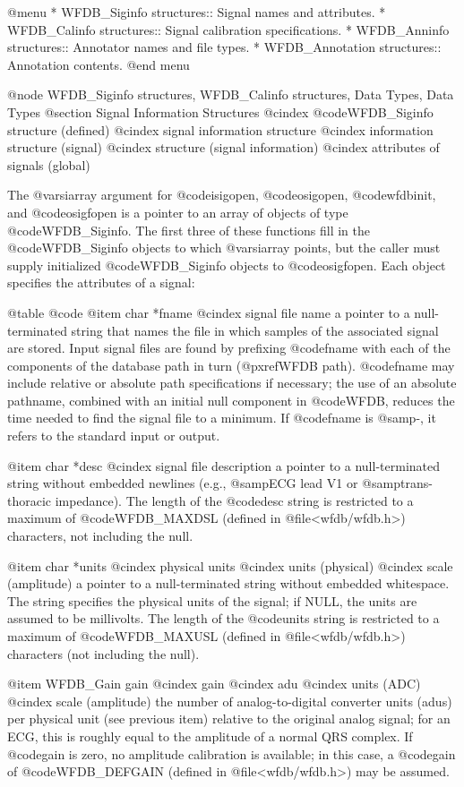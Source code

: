 {{{{{{{{{{@menu
* WFDB_Siginfo structures::		Signal names and attributes.
* WFDB_Calinfo structures::		Signal calibration specifications.
* WFDB_Anninfo structures::		Annotator names and file types.
* WFDB_Annotation structures::		Annotation contents.
@end menu

@node WFDB_Siginfo structures, WFDB_Calinfo structures, Data Types, Data Types
@section Signal Information Structures
@cindex @code{WFDB_Siginfo} structure (defined)
@cindex signal information structure
@cindex information structure (signal)
@cindex structure (signal information)
@cindex attributes of signals (global)

The @var{siarray} argument for @code{isigopen}, @code{osigopen},
@code{wfdbinit}, and @code{osigfopen} is a pointer to an array of
objects of type @code{WFDB_Siginfo}.  The first three of these functions
fill in the @code{WFDB_Siginfo} objects to which @var{siarray} points, but
the caller must supply initialized @code{WFDB_Siginfo} objects to
@code{osigfopen}.  Each object specifies the attributes of a
signal:

@table @code
@item char *fname
@cindex signal file name
a pointer to a null-terminated string that names the file in which
samples of the associated signal are stored.  Input signal files are
found by prefixing @code{fname} with each of the components of the
database path in turn (@pxref{WFDB path}).  @code{fname} may include
relative or absolute path specifications if necessary; the use of an
absolute pathname, combined with an initial null component in @code{WFDB},
reduces the time needed to find the signal file to a minimum.  If
@code{fname} is @samp{-}, it refers to the standard input or
output.

@item char *desc
@cindex signal file description
a pointer to a null-terminated string without embedded newlines (e.g.,
@samp{ECG lead V1} or @samp{trans-thoracic impedance}).  The length of
the @code{desc} string is restricted to a maximum of @code{WFDB_MAXDSL}
(defined in @file{<wfdb/wfdb.h>}) characters, not including the null.

@item char *units
@cindex physical units
@cindex units (physical)
@cindex scale (amplitude)
a pointer to a null-terminated string without embedded whitespace.  The
string specifies the physical units of the signal; if NULL, the units
are assumed to be millivolts.  The length of the @code{units} string is
restricted to a maximum of @code{WFDB_MAXUSL} (defined in
@file{<wfdb/wfdb.h>}) characters (not including the null).

@item WFDB_Gain gain
@cindex gain
@cindex adu
@cindex units (ADC)
@cindex scale (amplitude)
the number of analog-to-digital converter units (adus) per physical unit
(see previous item) relative to the original analog signal; for an ECG,
this is roughly equal to the amplitude of a normal QRS complex.  If
@code{gain} is zero, no amplitude calibration is available; in this
case, a @code{gain} of @code{WFDB_DEFGAIN} (defined in
@file{<wfdb/wfdb.h>}) may be assumed.

}}}}}}}}}}
